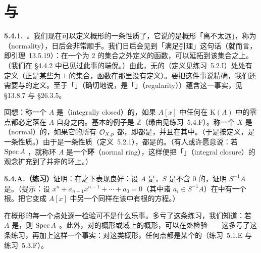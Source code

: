 
\section{\trNormality{}与\trFactoriality{}}

\textbf{5.4.1.}\ \emph{\trNormality{}。}\quad 我们现在可以定义概形的一条性质了，它说的是概形「离\trSmooth{}不太远」，称为\textbf{\trNormality}（normality），日后会非常顺手。我们日后会见到「\trLocally\trNoetherian{}\trNormal{}\trScheme{}满足\trHartogs{}引理」这句话（就\trNoetherian{}\trNormal{}\trScheme{}而言，即\trAlgebraic\trHartogs{}引理~13.5.19）：在一个\trCodimension{}为 $2$ 的集合之外定义的函数，可以延拓到该集合之上。（我们在 \S4.4.2 中已见过此事的端倪。）由此，无\trPole{}的\trRationalFunction（定义见练习~5.2.I）处处有定义（\trPole{}正是某些\trCodimension{}为 $1$ 的集合，函数在那里没有定义）。要把这件事说精确，我们还需要\trDimension{}与\trPole{}的定义。至于「\trSmoothness」（确切地说，是「\trRegularity{}」（regularity））蕴含\trNormality{}这一事实，见 \S13.8.7 与 \S26.3.5。

回想：称一个\trIntegralDomain{} $A$ 是\textbf{\trIntegrallyClosed{}}（integrally closed）的，如果 $A[x]$ 中任何\trMonicPolynomial{}在 $\mathrm{K}(A)$ 中的零点都必定落在 $A$ 自身之内。基本的例子是 $\mathbb{Z}$（缘由见练习~5.4.F）。称一个\trScheme{} $X$ 是\textbf{\trNormal}（normal）的，如果它的所有\trStalk{} $\mathcal{O}_{X,p}$ 都\trNormal，即都是\trIntegralDomain，并且在其\trFractionField{}中\trIntegrallyClosed{}。（于是按定义，\trNormality{}是一条\trStalkLocal{}性质。）由于\trReducedness{}是一条\trStalkLocal{}性质（定义~5.2.1），\trNormal{}\trScheme{}都是\trReduced{}的。（有人或许愿意说：若 $\operatorname{Spec} A$ \trNormal，就称环 $A$ 是一个\textbf{\trNormal{}环}（normal ring），这样便把「\trIntegralClosure{}」（integral closure）的观念扩充到了并非\trIntegralDomain{}的环上。）

\textbf{5.4.A.（练习）}\quad 证明：\trIntegrallyClosed{}\trIntegralDomain{}在\trLocalization{}之下表现良好：设 $A$ 是\trIntegrallyClosed{}\trIntegralDomain，$S$ 是不含 $0$ 的\trMultiplicativeSubset，证明 $S^{-1}A$ 是\trIntegrallyClosed{}\trIntegralDomain。（提示：设 $x^n+a_{n-1}x^{n-1}+\cdots+a_0=0$（其中诸 $a_i\in S^{-1}A$）在\trFractionField{}中有一个根。把它变成 $A[x]$ 中另一个同样在该\trFractionField{}中有根的方程。）

在概形的每一个点处逐一检验\trNormality{}可不是什么乐事。多亏了这条练习，我们知道：若 $A$ 是\trIntegrallyClosed{}\trIntegralDomain，则 $\operatorname{Spec} A$ \trNormal。此外，对\trQuasicompact{}的概形或域上\trLocally\trFiniteType{}的概形，\trNormality{}可以在\trClosedPoint{}处检验——这多亏了这条练习，再加上这样一个事实：对这类概形，任何点都是某个\trClosedPoint{}的\trGenerization（练习~5.1.E 与练习~5.3.F）。

